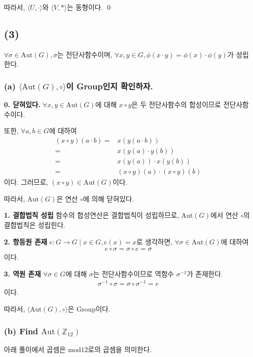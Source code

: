 \documentclass{article}
\begin{document}
따라서, $\langle U, \cdot \rangle$와 $\langle V, * \rangle$는 동형이다. \qed


\subsection{(3)}
$\forall \sigma \in \text{Aut}(G), \sigma$는 전단사함수이며, $\forall x, y \in G, \phi(x\cdot y) = \phi(x) \cdot \phi(y)$가 성립한다.

\subsubsection{(a) $\langle \text{Aut}(G), \circ \rangle$이 Group인지 확인하자.}
\textbf{0. 닫혀있다.} $\forall x, y \in \text{Aut}(G)$에 대해 $x \circ y$은 두 전단사함수의 합성이므로 전단사함수이다.

또한, $\forall a, b \in G$에 대하여
\begin{align*}
(x \circ y)(a \cdot b) =& x(y(a \cdot b))
\\ =& x(y(a) \cdot y(b))
\\ =& x(y(a)) \cdot x(y(b))
\\ =& (x \circ y) (a) \cdot (x \circ y)(b)
\end{align*}이다. 그러므로, $(x \circ y) \in  \text{Aut}(G)$이다. 

따라서, $\text{Aut}(G)$은 연산 $\circ$에 의해 닫혀있다.

\textbf{1. 결합법칙 성립}
함수의 합성연산은 결합법칙이 성립하므로,  $\text{Aut}(G)$에서 연산 $\circ$의 결합법칙은 성립힌다.

\textbf{2. 항등원 존재} $e : G \rightarrow G \mid x \in G, e(x) = x$로 생각하면, $\forall \sigma \in \text{Aut}(G)$에 대하여
\begin{align*}
e \circ \sigma = \sigma \circ e = \sigma
\end{align*}이다.

\textbf{3. 역원 존재} $\forall \sigma \in G$에 대해 $\sigma$는 전단사함수이므로 역함수 $\sigma ^{-1}$가 존재한다.
\begin{align*}
\sigma^{-1} \circ \sigma = \sigma \circ \sigma^{-1} = e
\end{align*}이다.

따라서, $\langle \text{Aut}(G), \circ \rangle$은 Group이다.


\subsubsection{(b) Find $\text{Aut}(\mathbb{Z}_{12})$}
아래 풀이에서 곱셈은 $\text{mod} 12$로의 곱셈을 의미한다.
\end{document}
